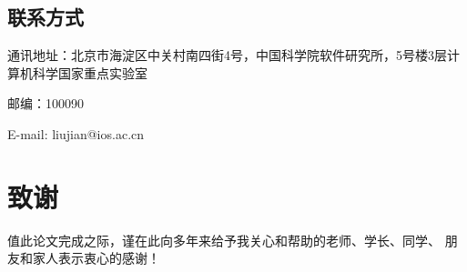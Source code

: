 \section*{联系方式}

通讯地址：北京市海淀区中关村南四街4号，中国科学院软件研究所，5号楼3层计算机科学国家重点实验室

邮编：100090

E-mail: liujian@ios.ac.cn



\chapter{致谢}

值此论文完成之际，谨在此向多年来给予我关心和帮助的老师、学长、同学、
朋友和家人表示衷心的感谢！

\cleardoublepage[plain]%

